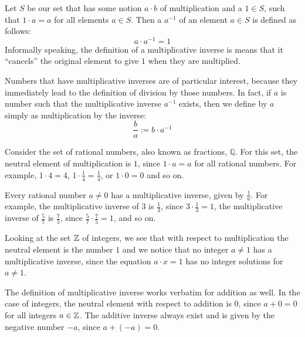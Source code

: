 Let $S$ be our set that has some notion $a\cdot b$ of multiplication and a  $1\in S$, such that $1\cdot a = a$ for all elements $a\in S$. Then a  $a^{-1}$ of an element $a\in S$ is defined as follows:
\begin{equation}
a\cdot a^{-1} = 1
\end{equation}
Informally speaking, the definition of a multiplicative inverse is means that it ``cancels'' the original element to give $1$ when they are multiplied. 

Numbers that have multiplicative inverses are of particular interest, because they immediately lead to the definition of division by those numbers. In fact, if $a$ is number such that the multiplicative inverse $a^{-1}$ exists, then we define  by $a$ simply as multiplication by the inverse:
\begin{equation}
\frac{b}{a}:= b\cdot a^{-1}
\end{equation}
\begin{example} Consider the set of rational numbers, also known as fractions, $\mathbb{Q}$. For this set, the neutral element of multiplication is $1$, since $1\cdot a = a$ for all rational numbers. For example, $1\cdot 4=4$, $1\cdot \frac{1}{4}=\frac{1}{4}$, or $1\cdot 0 =0$ and so on.

Every rational number $a\neq 0$ has a multiplicative inverse, given by $\frac{1}{a}$. 
For example, the multiplicative inverse of $3$ is $\frac{1}{3}$, since $3\cdot \frac{1}{3}=1$, the multiplicative inverse of $\frac{5}{7}$ is $\frac{7}{5}$, since $\frac{5}{7}\cdot \frac{7}{5}=1$, and so on. 
\end{example}
\begin{example}Looking at  the set $\mathbb{Z}$ of integers, we see that with respect to multiplication the neutral element is the number $1$ and we notice that no integer $a\neq 1$ has a multiplicative inverse, since the equation $a\cdot x =1$ has no integer solutions for $a\neq 1$. 

The definition of multiplicative inverse works verbatim for addition as well. In the case of integers, the neutral element with respect to addition is $0$, since $a+0=0$ for all integers $a\in\mathbb{Z}$. The additive inverse always exist and is given by the negative number $-a$, since $a+(-a)=0$.
\end{example}
